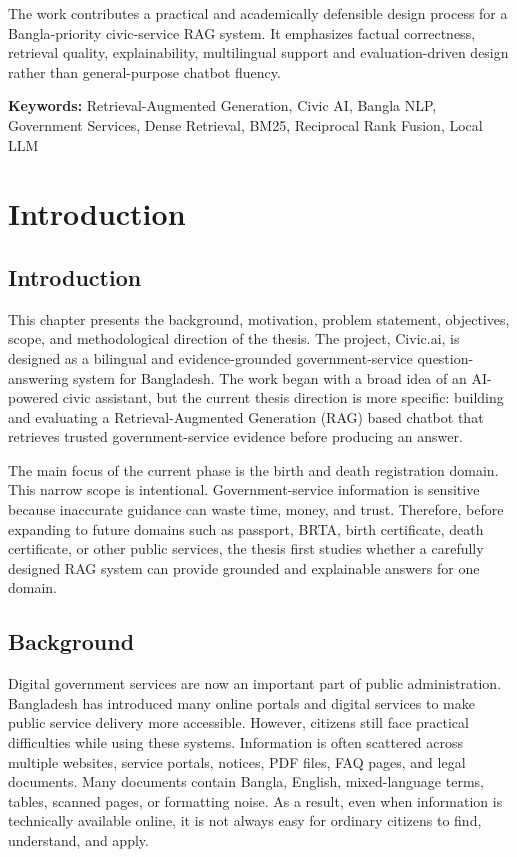 \documentclass[12pt,oneside,openany]{report}
\begin{document}
The work contributes a practical and academically defensible design process for a Bangla-priority civic-service RAG system. It emphasizes factual correctness, retrieval quality, explainability, multilingual support and evaluation-driven design rather than general-purpose chatbot fluency.

\vspace{1cm}
\textbf{Keywords:} Retrieval-Augmented Generation, Civic AI, Bangla NLP, Government Services, Dense Retrieval, BM25, Reciprocal Rank Fusion, Local LLM
\pagebreak

\tableofcontents
\listoffigures
\listoftables
\clearpage

\chapter{Introduction}
\section{Introduction}
This chapter presents the background, motivation, problem statement, objectives, scope, and methodological direction of the thesis. The project, Civic.ai, is designed as a bilingual and evidence-grounded government-service question-answering system for Bangladesh. The work began with a broad idea of an AI-powered civic assistant, but the current thesis direction is more specific: building and evaluating a Retrieval-Augmented Generation (RAG) based chatbot that retrieves trusted government-service evidence before producing an answer.

The main focus of the current phase is the birth and death registration domain. This narrow scope is intentional. Government-service information is sensitive because inaccurate guidance can waste time, money, and trust. Therefore, before expanding to future domains such as passport, BRTA, birth certificate, death certificate, or other public services, the thesis first studies whether a carefully designed RAG system can provide grounded and explainable answers for one domain.

\section{Background}
Digital government services are now an important part of public administration. Bangladesh has introduced many online portals and digital services to make public service delivery more accessible. However, citizens still face practical difficulties while using these systems. Information is often scattered across multiple websites, service portals, notices, PDF files, FAQ pages, and legal documents. Many documents contain Bangla, English, mixed-language terms, tables, scanned pages, or formatting noise. As a result, even when information is technically available online, it is not always easy for ordinary citizens to find, understand, and apply.
\end{document}
